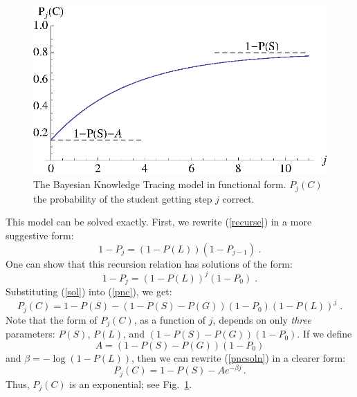 \documentclass{acmlarge-edm}
\begin{document}
\begin{figure}
\centering\includegraphics{exponential.eps}
\caption{The Bayesian Knowledge Tracing model in functional form. 
          $P_j(C)$ the probability of  the student getting step $j$ correct.}
 \label{bktgraph}
\end{figure}

This model can be  solved exactly.  First, we rewrite (\ref{recurse}) in a
more suggestive form:
%
\begin{equation}
        1-P_j = \left(1-P(L)\right) \left(1-P_{j-1}\right) \; .
\end{equation}
%
One can show that this recursion relation has solutions of the form:
%
\begin{equation}
            1-P_j = \left(1-P(L)\right)^j\left(1-P_0\right) \; .
	    \label{sol}
\end{equation}
%
%
Substituting (\ref{sol}) into (\ref{pnc}), we get:
%
\begin{equation}
         P_j(C) = 1-P(S) -\left(1-P(S)-P(G)\right) \left(1-P_0\right)
                   \left(1-P(L)\right)^j \; . \label{pncsoln}
\end{equation}
%
Note that the form of $P_j(C)$, as a function of $j$, 
depends on only {\em three} parameters:  $P(S)$, $P(L)$, and 
$\left(1-P(S)-P(G)\right) \left(1-P_0\right)$.
If we define
%
\begin{equation} 
          A=\left(1-P(S)-P(G)\right) \left(1-P_0\right)  \label{aa}
\end{equation}
%
 and $\beta=-\log(1-P(L))$, then we can rewrite (\ref{pncsoln}) in 
a clearer form:
%
\begin{equation}
         P_j(C) = 1-P(S) -A e^{-\beta j} \, .
\end{equation}
%
Thus, $P_j(C)$ is an exponential; see Fig.~\ref{bktgraph}.
\end{document}
